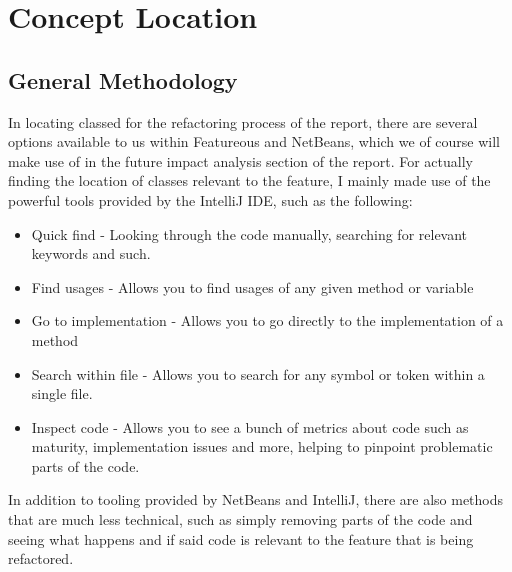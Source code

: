 \section{Concept Location}
\subsection{General Methodology}
In locating classed for the refactoring process of the report, there are several options available to us within Featureous and NetBeans, which we of course will make use of in the future impact analysis section of the report. For actually finding the location of classes relevant to the feature, I mainly made use of the powerful tools provided by the IntelliJ IDE, such as the following:

\begin{itemize}
    \item Quick find - Looking through the code manually, searching for relevant keywords and such.
    \item Find usages - Allows you to find usages of any given method or variable
    \item Go to implementation - Allows you to go directly to the implementation of a method
    \item Search within file - Allows you to search for any symbol or token within a single file.
    \item Inspect code - Allows you to see a bunch of metrics about code such as maturity, implementation issues and more, helping to pinpoint problematic parts of the code.
\end{itemize}

In addition to tooling provided by NetBeans and IntelliJ, there are also methods that are much less technical, such as simply removing parts of the code and seeing what happens and if said code is relevant to the feature that is being refactored.

